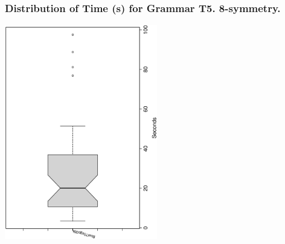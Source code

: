  \begin{frame}
 \frametitle{ Distribution of Time (s) for Grammar T5. 8-symmetry. }
 \begin{center}
\includegraphics[width=0.5\textwidth, angle=-90]
{ExpFboxplottSeconds006.eps}
 \end{center}
 \label{ExpFboxplottSeconds006.eps}  
 \end{frame}

